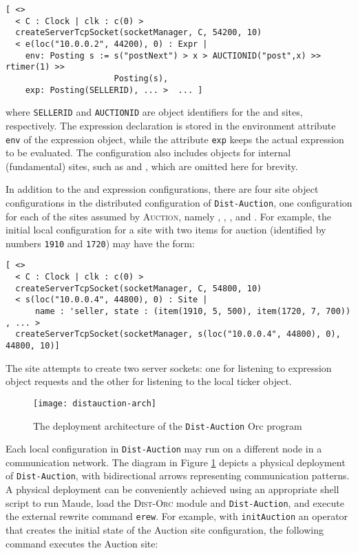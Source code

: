\documentclass{eptcs}
\begin{document}
\begin{small}
\begin{verbatim}
[ <> 
  < C : Clock | clk : c(0) > 
  createServerTcpSocket(socketManager, C, 54200, 10)
  < e(loc("10.0.0.2", 44200), 0) : Expr | 
    env: Posting s := s("postNext") > x > AUCTIONID("post",x) >> rtimer(1) >> 
                      Posting(s), 
    exp: Posting(SELLERID), ... >  ... ]
\end{verbatim}
\end{small}

\noindent where \texttt{SELLERID} and \texttt{AUCTIONID} are object identifiers for the  and  sites, respectively. The  expression declaration is stored in the environment attribute \texttt{env} of the expression object, while the attribute \texttt{exp} keeps the actual expression to be evaluated. The configuration also includes objects for internal (fundamental) sites, such as  and , which are omitted here for brevity.

In addition to the  and  expression configurations, there are four site object configurations in the distributed configuration of \texttt{Dist-Auction}, one configuration for each of the sites assumed by \textsc{Auction}, namely , , , and . For example, the initial local configuration for a   site with two items for auction (identified by numbers \texttt{1910} and \texttt{1720}) may have the form:

\begin{small}
\begin{verbatim}
[ <> 
  < C : Clock | clk : c(0) > 
  createServerTcpSocket(socketManager, C, 54800, 10)
  < s(loc("10.0.0.4", 44800), 0) : Site | 
      name : 'seller, state : (item(1910, 5, 500), item(1720, 7, 700)) , ... >
  createServerTcpSocket(socketManager, s(loc("10.0.0.4", 44800), 0), 44800, 10)]
\end{verbatim}
\end{small}

\noindent The site attempts to create two server sockets: one for listening to expression object requests and the other for listening to the local ticker object. 


\begin{figure} 	
	\centering
	\texttt{[image: distauction-arch]}
	\caption{The deployment architecture of the \texttt{Dist-Auction} Orc program}
    \label{fig:Dist-Auction-arch}
\end{figure}

Each local configuration in \texttt{Dist-Auction} may run on a different node in a communication network. The diagram in Figure \ref{fig:Dist-Auction-arch} depicts a physical deployment of \texttt{Dist-Auction}, with bidirectional arrows representing communication patterns. A physical deployment can be conveniently achieved using an appropriate shell script to run Maude, load the \textsc{Dist-Orc} module and \texttt{Dist-Auction}, and execute the external rewrite command \texttt{erew}. For example, with \texttt{initAuction} an operator that creates the initial state of the Auction site configuration, the following command executes the Auction site:
\end{document}
